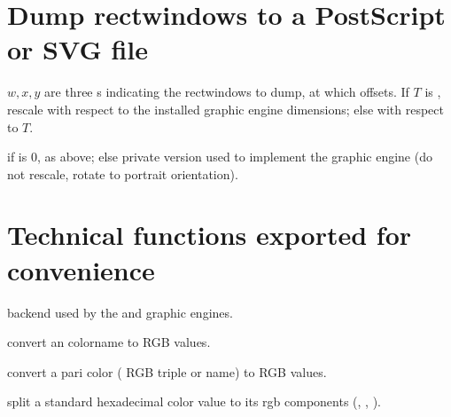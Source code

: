 \section{Dump rectwindows to a PostScript or SVG file}

$w,x,y$ are three s indicating the rectwindows to dump, at
which offsets. If $T$ is , rescale with respect to the installed
graphic engine dimensions; else with respect to $T$.


if  is $0$, as above; else private version used to implement
the  graphic engine (do not rescale, rotate to portrait
orientation).


\section{Technical functions exported for convenience}

backend used by the  and  graphic engines.

 convert
an  colorname to RGB values.

 convert a pari color
( RGB triple or  name) to RGB values.

 split a standard
hexadecimal color value  to its rgb components (,
, ).
\newpage
